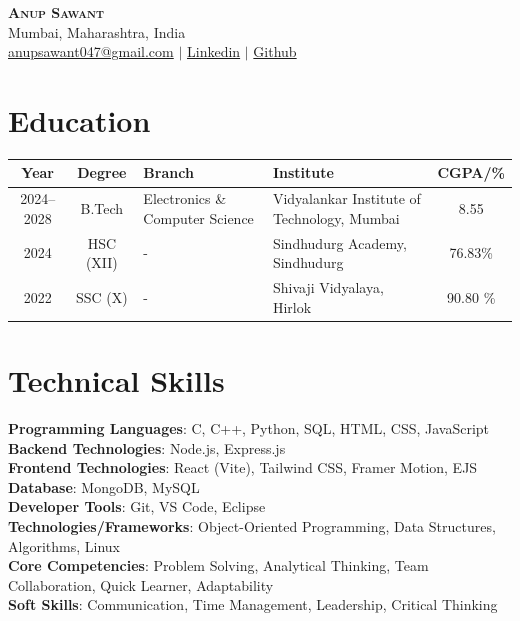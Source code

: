 \documentclass[letterpaper,11pt]{article}
\begin{document}
\begin{center}
    \textbf{\Huge \scshape Anup Sawant} \\ \vspace{2pt}
    \small Mumbai, Maharashtra, India \\ \vspace{1pt}
    \small \href{mailto:anupsawant047@gmail.com}{anupsawant047@gmail.com} $|$ 
   \small{\href{https://www.linkedin.com/in/anup-sawant-859238259/}{Linkedin}}
   $|$
    \small{\href{https://github.com/anup-sawant12}{Github}}
\end{center}


\section{Education}

\setlength{\tabcolsep}{6pt}
\renewcommand{\arraystretch}{1.5}

\begin{tabularx}{\textwidth}{|c|c|X|X|c|}
\hline
\textbf{Year} & \textbf{Degree} & \textbf{Branch} & \textbf{Institute} & \textbf{CGPA/\%} \\
\hline
2024--2028 &
B.Tech &
Electronics \& Computer Science &
Vidyalankar Institute of Technology, Mumbai &
8.55 \\
\hline
2024 &
HSC (XII) &
- &
Sindhudurg Academy, Sindhudurg &
76.83\% \\
\hline
2022 &
SSC (X) &
- &
Shivaji Vidyalaya, Hirlok &
90.80 \% \\
\hline
\end{tabularx}

\section{Technical Skills}
 \begin{itemize}[leftmargin=0.15in, label={}]
    \small{\item{
     \textbf{Programming Languages}{: C, C++, Python, SQL, HTML, CSS, JavaScript} \\
     \textbf{Backend Technologies}{: Node.js, Express.js} \\
     \textbf{Frontend Technologies}{: React (Vite), Tailwind CSS, Framer Motion, EJS} \\
     \textbf{Database}{: MongoDB, MySQL} \\
     \textbf{Developer Tools}{: Git, VS Code, Eclipse} \\
     \textbf{Technologies/Frameworks}{: Object-Oriented Programming, Data Structures, Algorithms, Linux} \\
     \textbf{Core Competencies}{: Problem Solving, Analytical Thinking, Team Collaboration, Quick Learner, Adaptability} \\
     \textbf{Soft Skills}{: Communication, Time Management, Leadership, Critical Thinking}
    }}
 \end{itemize}
\end{document}

